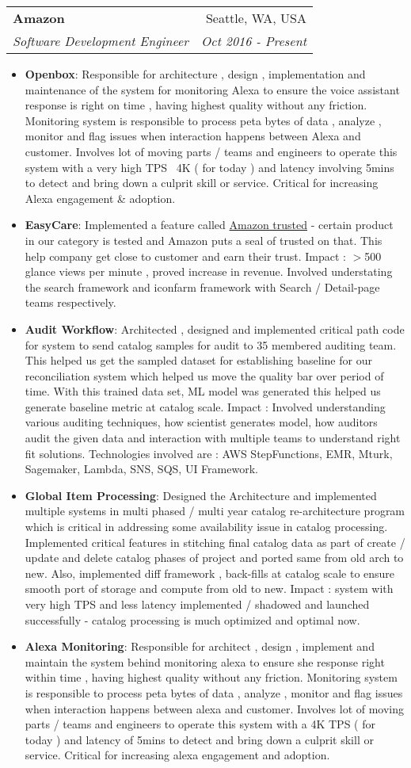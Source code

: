 \documentclass[letterpaper,11pt]{article}
\makeatletter
\newcommand{\resumeItem}[2]{
  \item\small{
    \textbf{#1}{: #2 \vspace{-2pt}}
  }
}
\newcommand{\resumeSubheading}[4]{
  \vspace{-1pt}\item
    \begin{tabular*}{0.97\textwidth}{l@{\extracolsep{\fill}}r}
      \textbf{#1} & #2 \\
      \textit{\small#3} & \textit{\small #4} \\
    \end{tabular*}\vspace{-5pt}
}
\newcommand{\resumeItemListStart}{\begin{itemize}}
\newcommand{\resumeItemListEnd}{\end{itemize}\vspace{-5pt}}
\makeatother
\begin{document}
    \resumeSubheading
      {Amazon}{Seattle, WA, USA}
      {Software Development Engineer}{Oct 2016 - Present}
      \resumeItemListStart
        \resumeItem{Openbox}
          {Responsible for architecture , design , implementation and maintenance of the system for monitoring Alexa to ensure the voice assistant response is right on time , having highest quality without any friction. Monitoring system is responsible to process peta bytes of data , analyze , monitor and flag issues when interaction happens between Alexa and customer. Involves lot of moving parts / teams and engineers to operate this system with a very high TPS ~4K ( for today ) and latency involving 5mins to detect and bring down a culprit skill or service. Critical for increasing Alexa engagement & adoption.}
        \resumeItem{EasyCare}
          {Implemented a feature called \href{https://www.amazon.in/amazontrusted}{Amazon trusted} - certain product in our category is tested and Amazon puts a seal of trusted on that. This help company get close to customer and earn their trust. Impact : $>$500 glance views per minute , proved increase in revenue. Involved understating the search framework and iconfarm framework with Search / Detail-page teams respectively.}
        \resumeItem{Audit Workflow}
          {Architected , designed and implemented critical path code for system to send catalog samples for audit to 35 membered auditing team. This helped us get the sampled dataset for establishing baseline for our reconciliation system which helped us move the quality bar over period of time. With this trained data set, ML model was generated this helped us generate baseline metric at catalog scale. Impact : Involved understanding various auditing techniques, how scientist generates model, how auditors audit the given data and interaction with multiple teams to understand right fit solutions. Technologies involved are : AWS StepFunctions, EMR, Mturk, Sagemaker, Lambda, SNS, SQS, UI Framework.}
        \resumeItem{Global Item Processing}
          {Designed the Architecture and implemented multiple systems in multi phased / multi year catalog re-architecture program which is critical in addressing some availability issue in catalog processing. Implemented critical features in stitching final catalog data as part of create / update and delete catalog phases of project and ported same from old arch to new. Also, implemented diff framework , back-fills at catalog scale to ensure smooth port of storage and compute from old to new. Impact : system with very high TPS and less latency implemented / shadowed and launched successfully - catalog processing is much optimized and optimal now.}
         \resumeItem{Alexa Monitoring}
          {Responsible for architect , design , implement and maintain the system behind monitoring alexa to ensure she response right within time , having highest quality without any friction. Monitoring system is responsible to process peta bytes of data , analyze , monitor and flag issues when interaction happens between alexa and customer. Involves lot of moving parts / teams and engineers to operate this system with a 4K TPS ( for today ) and latency of 5mins to detect and bring down a culprit skill or service. Critical for increasing alexa engagement and adoption.}
      \resumeItemListEnd
\end{document}
